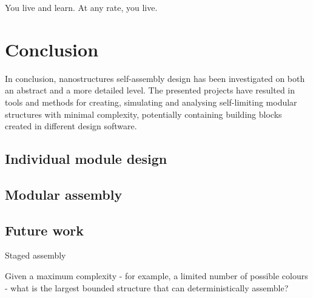\begin{savequote}[8cm]
You live and learn. At any rate, you live.
\end{savequote}

\chapter{Conclusion}

In conclusion, nanostructures self-assembly design has been investigated on both an abstract and a more detailed level. The presented projects have resulted in tools and methods for creating, simulating and analysing self-limiting modular structures with minimal complexity, potentially containing building blocks created in different design software.

\section{Individual module design}

\section{Modular assembly}

\section{Future work}

Staged assembly

Given a maximum complexity - for example, a limited number of possible colours - what is the largest bounded structure that can deterministically assemble?